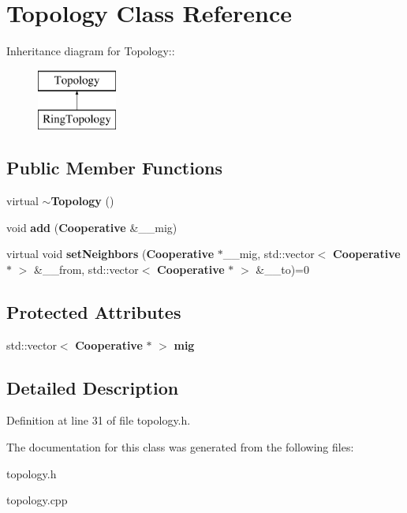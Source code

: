 \section{Topology Class Reference}
\label{class_topology}
Inheritance diagram for Topology::\begin{figure}[H]
\begin{center}
\leavevmode
\includegraphics[height=2cm]{class_topology}
\end{center}
\end{figure}
\subsection*{Public Member Functions}
\begin{CompactItemize}
\item 
virtual {\bf $\sim$Topology} ()\label{class_topology_3e447669757c8311c7f6f8edc705abf2}

\item 
void {\bf add} ({\bf Cooperative} \&\_\-\_\-mig)\label{class_topology_62bc46d8c20fdc71dad9e7c7a0d7aded}

\item 
virtual void {\bf set\-Neighbors} ({\bf Cooperative} $\ast$\_\-\_\-mig, std::vector$<$ {\bf Cooperative} $\ast$ $>$ \&\_\-\_\-from, std::vector$<$ {\bf Cooperative} $\ast$ $>$ \&\_\-\_\-to)=0\label{class_topology_86c006ad698649b2ba5016a5ddd619ce}

\end{CompactItemize}
\subsection*{Protected Attributes}
\begin{CompactItemize}
\item 
std::vector$<$ {\bf Cooperative} $\ast$ $>$ {\bf mig}\label{class_topology_247a2faa8568b678f0b7b11e62c7812c}

\end{CompactItemize}


\subsection{Detailed Description}




Definition at line 31 of file topology.h.

The documentation for this class was generated from the following files:\begin{CompactItemize}
\item 
topology.h\item 
topology.cpp\end{CompactItemize}
